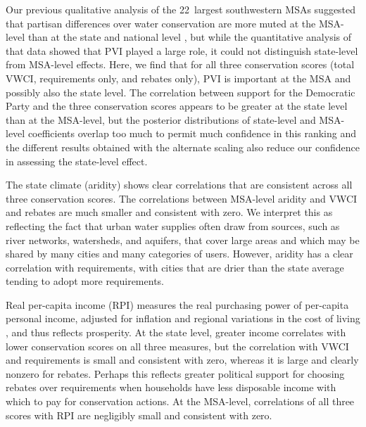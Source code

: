 \documentclass[draft,linenumbers]{agujournal}\usepackage{knitr}
\begin{document}
Our previous qualitative analysis of the 22~largest southwestern MSAs suggested
that partisan differences over water conservation are more muted at the
MSA-level than at the state and national level \citep{hess:drought:2016}, but
while the quantitative analysis of that data showed that PVI played a large
role, it could not distinguish state-level from MSA-level effects.
Here, we find that for all three conservation scores (total VWCI, requirements
only, and rebates only), PVI is important at the MSA and possibly also the state level.
The correlation between
support for the Democratic Party
and the three conservation scores appears to be
greater at the state level than at the MSA-level, but the posterior
distributions of state-level and MSA-level coefficients overlap too much to
permit much confidence in this ranking and the different results obtained
with the alternate scaling also reduce our confidence in assessing the state-level
effect.

The state climate (aridity) shows clear
correlations
that are consistent across all three conservation scores.
The
correlations between
MSA-level aridity
and
VWCI and rebates are much
smaller
and consistent with zero.
We interpret this as reflecting the fact that urban water supplies often draw from
sources, such as river networks, watersheds, and aquifers, that cover large areas
and which may be shared by many cities and many categories of users.
However, aridity has a clear
correlation with
requirements, with cities that are
drier than the state average tending to adopt more requirements.

Real per-capita income (RPI) measures the real purchasing power of
per-capita personal income, adjusted for inflation and regional variations in the
cost of living
\citep{bea:rpp.methodology:2016}, and thus reflects prosperity.
At the state level, greater income correlates with lower conservation scores on
all three measures, but the
correlation with VWCI and requirements
is small and
consistent with zero,
whereas it is large and clearly nonzero for rebates.
Perhaps this reflects greater political support for choosing rebates over
requirements when households have less disposable income with which to pay for
conservation actions.
At the MSA-level,
correlations of all three scores with RPI
are negligibly small and
consistent with zero.
\end{document}
